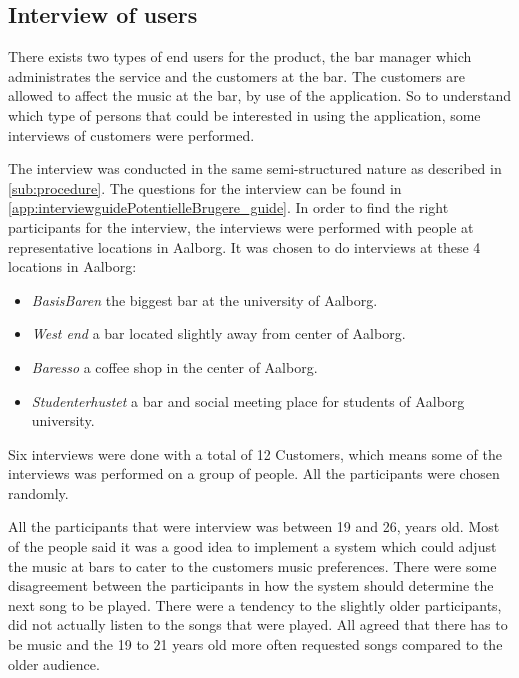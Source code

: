 \subsection{Interview of users}
\label{userInterviews}

There exists two types of end users for the product, the bar manager which administrates the service and the customers at the bar. The customers are allowed to affect the music at the bar, by use of the application. So to understand which type of persons that could be interested in using the application, some interviews of customers were performed.

The interview was conducted in the same semi-structured nature as described in  \cref{sub:procedure}. The questions for the interview can be found in \cref{app:interviewguidePotentielleBrugere_guide}. In order to find the right participants for the interview, the interviews were performed with people at representative locations in Aalborg. It was chosen to do interviews at these 4 locations in Aalborg:

\begin{itemize}
    \item \emph{BasisBaren} the biggest bar at the university of Aalborg.
    \item \emph{West end} a bar located slightly away from center of Aalborg.
    \item \emph{Baresso} a coffee shop in the center of Aalborg.
    \item \emph{Studenterhustet} a bar and social meeting place for students of Aalborg university.
\end{itemize}

Six interviews were done with a total of 12 Customers, which means some of the interviews was performed on a group of people. All the participants were chosen randomly.

All the participants that were interview was between 19 and 26, years old. Most of the people said it was a good idea to implement a system which could adjust the music at bars to cater to the customers music preferences. There were some disagreement between the participants in how the system should determine the next song to be played. There were a tendency to the slightly older participants, did not actually listen to the songs that were played. All agreed that there has to be music and the 19 to 21 years old more often requested songs compared to the older audience.
